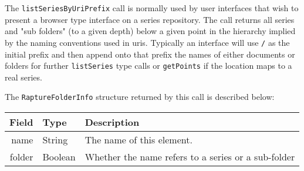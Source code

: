 The \verb+listSeriesByUriPrefix+ call is normally used by user interfaces that wish
to present a browser type interface on a series repository. The call returns all series
and "sub folders" (to a given depth) below a given point in the hierarchy implied
by the naming conventions used in uris. Typically an interface will use \verb+/+ as
the initial prefix and then append onto that prefix the names of either documents
or folders for further \verb+listSeries+ type calls or \verb+getPoints+ if the location
maps to a real series.

The \verb+RaptureFolderInfo+ structure returned by this call is described below:

\begin{table}[ht]
\begin{center}
\begin{tabular}{r l p{8cm}}
  Field & Type & Description \\
  \hline
  name & String & The name of this element. \\
  folder & Boolean & Whether the name refers to a series or a sub-folder \\
\end{tabular}
\end{center}
\end{table}
